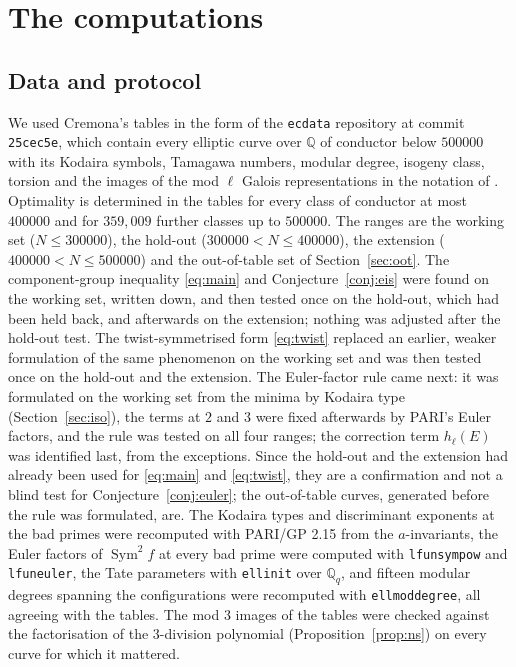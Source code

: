 \documentclass[11pt]{amsart}
\theoremstyle{definition}
\newcommand{\Q}{\mathbb{Q}}
\newcommand{\Sym}{\operatorname{Sym}^2}
\begin{document}
\section{The computations}\label{sec:data}

\subsection{Data and protocol}
We used Cremona's tables \cite{Cremona97} in the form of the \texttt{ecdata} repository at commit \texttt{25cec5e}, which contain every elliptic curve over $\Q$ of conductor below $500000$ with its Kodaira symbols, Tamagawa numbers, modular degree, isogeny class, torsion and the images of the mod $\ell$ Galois representations in the notation of \cite{Sutherland16}. Optimality is determined in the tables for every class of conductor at most $400000$ and for $359{,}009$ further classes up to $500000$. The ranges are the working set ($N\le300000$), the hold-out ($300000<N\le400000$), the extension ($400000<N\le500000$) and the out-of-table set of Section~\ref{sec:oot}. The component-group inequality \eqref{eq:main} and Conjecture~\ref{conj:eis} were found on the working set, written down, and then tested once on the hold-out, which had been held back, and afterwards on the extension; nothing was adjusted after the hold-out test. The twist-symmetrised form \eqref{eq:twist} replaced an earlier, weaker formulation of the same phenomenon on the working set and was then tested once on the hold-out and the extension. The Euler-factor rule came next: it was formulated on the working set from the minima by Kodaira type (Section~\ref{sec:iso}), the terms at $2$ and $3$ were fixed afterwards by PARI's Euler factors, and the rule was tested on all four ranges; the correction term $h_\ell(E)$ was identified last, from the exceptions. Since the hold-out and the extension had already been used for \eqref{eq:main} and \eqref{eq:twist}, they are a confirmation and not a blind test for Conjecture~\ref{conj:euler}; the out-of-table curves, generated before the rule was formulated, are. The Kodaira types and discriminant exponents at the bad primes were recomputed with PARI/GP 2.15 \cite{PARI} from the $a$-invariants, the Euler factors of $\Sym f$ at every bad prime were computed with \texttt{lfunsympow} and \texttt{lfuneuler}, the Tate parameters with \texttt{ellinit} over $\Q_q$, and fifteen modular degrees spanning the configurations were recomputed with \texttt{ellmoddegree}, all agreeing with the tables. The mod $3$ images of the tables were checked against the factorisation of the $3$-division polynomial (Proposition~\ref{prop:ns}) on every curve for which it mattered.
\end{document}
